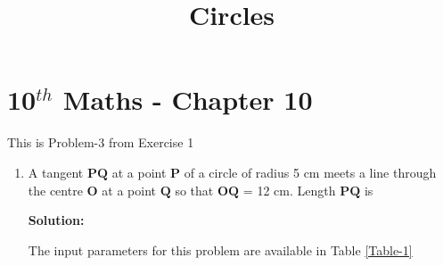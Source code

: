 \documentclass[12pt]{article}
\newcommand{\solution}{\noindent \textbf{Solution: }}
\let\vec\mathbf
\begin{document}
\begin{center}
\enlargethispage{-4cm}
\title{\textbf{Circles}}
\date{\vspace{-5ex}} %
\maketitle
\end{center}
\setcounter{page}{1}
\section*{10$^{th}$ Maths - Chapter 10}
This is Problem-3 from Exercise 1
\begin{enumerate}
\item A tangent $\vec{PQ}$ at a point $\vec{P}$ of a circle of radius 5 cm meets a line through the centre $\vec{O}$ at a point $\vec{Q}$ so that $\vec{OQ}$ = 12 cm. Length $\vec{PQ}$ is

\solution 

The input parameters for this problem are available in Table \eqref{Table-1}
\begin{table}[ht!]\centering

\caption{}
\label{Table-1} 
\end{table}


\end{enumerate}
\end{document}
